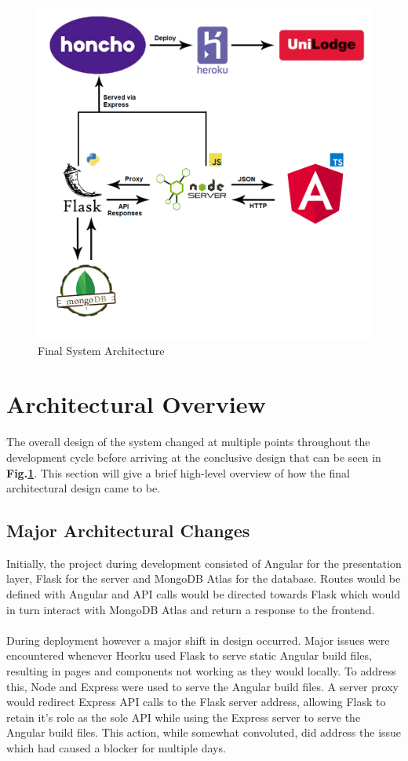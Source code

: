 \begin{figure}[H]
	\caption{Final System Architecture}
	\label{image:design}
	\centering
	\includegraphics[width=1\textwidth]{images/design.png}
\end{figure}	

\section{Architectural Overview}
The overall design of the system changed at multiple points throughout the development cycle before arriving at the conclusive design that can be seen in \textbf{Fig.\ref{image:design}}. This section will give a brief high-level overview of how the final architectural design came to be.

\subsection{Major Architectural Changes}
Initially, the project during development consisted of Angular for the presentation layer, Flask for the server and MongoDB Atlas for the database. Routes would be defined with Angular and API calls would be directed towards Flask which would in turn interact with MongoDB Atlas and return a response to the frontend.

\paragraph{}
During deployment however a major shift in design occurred. Major issues were encountered whenever Heorku used Flask to serve static Angular build files, resulting in pages and components not working as they would locally. To address this, Node and Express were used to serve the Angular build files. A server proxy would redirect Express API calls to the Flask server address, allowing Flask to retain it's role as the sole API while using the Express server to serve the Angular build files. This action, while somewhat convoluted, did address the issue which had caused a blocker for multiple days.

